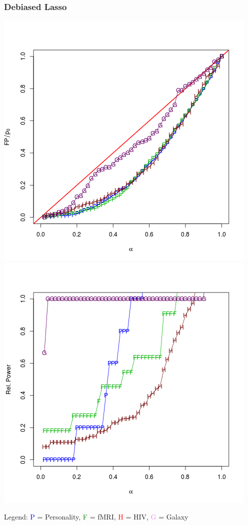 \documentclass{beamer}
\begin{document}
\begin{frame}
\frametitle{Debiased Lasso}

\begin{center}
\includegraphics[scale = 0.3]{ress_s_type1.png}
\includegraphics[scale = 0.3]{ress_s_power.png}
\end{center}

Legend: \textcolor{blue}{P} = Personality, \textcolor{green}{F} = fMRI,
\textcolor{red}{H} = HIV, \textcolor{violet}{G} = Galaxy
\end{frame}
\end{document}
